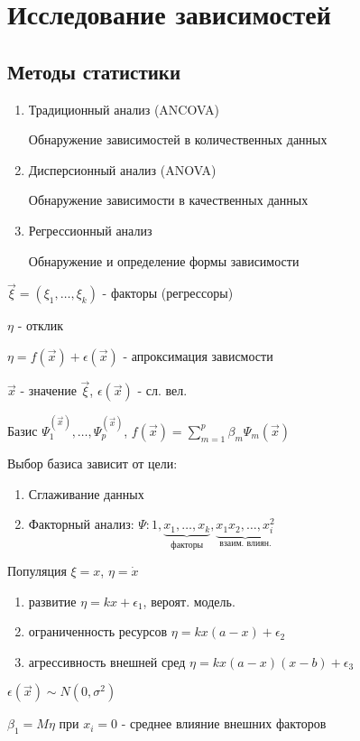 \documentclass{article}
\begin{document}
\section{Исследование зависимостей}
\subsection{Методы статистики}
\begin{enumerate}
  \item Традиционный анализ (ANCOVA)

    Обнаружение зависимостей в количественных данных
  \item Дисперсионный анализ (ANOVA)

    Обнаружение зависимости в качественных данных
  \item Регрессионный анализ

    Обнаружение и определение формы зависимости
\end{enumerate}

\hr
$\vec{\xi}=(\xi_1,\dots ,\xi_k)$ - факторы (регрессоры)

$\eta$ - отклик 

$\eta = f(\vec x)+\epsilon(\vec x)$ - апроксимация зависмости

$\vec{x}$ - значение $\vec{\xi}$, $\epsilon(\vec{x})$ - сл. вел.

Базис $\Psi_1^{(\vec{x})},\dots ,\Psi_p^{(\vec{x})}$, $f(\vec{x})=\sum_{m=1}^{p}\beta_m\Psi_m(\vec{x})$

Выбор базиса зависит от цели:
\begin{enumerate}
  \item Сглаживание данных
  \item Факторный анализ: $\Psi: 1,\underbrace{x_1,\dots ,x_k}_{\text{факторы}},\underbrace{x_1x_2,\dots, x_i^2}_{\text{взаим. влиян.}} $
\end{enumerate}
\begin{eg}
  Популяция $\xi=x$, $\eta=\dot{x}$
  \begin{enumerate}
    \item развитие $\eta=kx+\epsilon_1$, вероят. модель.
    \item ограниченность ресурсов $\eta=kx(a-x)+\epsilon_2$
    \item агрессивность внешней сред $\eta=kx(a-x)(x-b)+\epsilon_3$
  \end{enumerate}
\end{eg}
$\epsilon(\vec{x})\sim N(0, \sigma^{2})$

$\beta_1=M\eta$ при $x_i=0$ - среднее влияние внешних факторов
\end{document}
